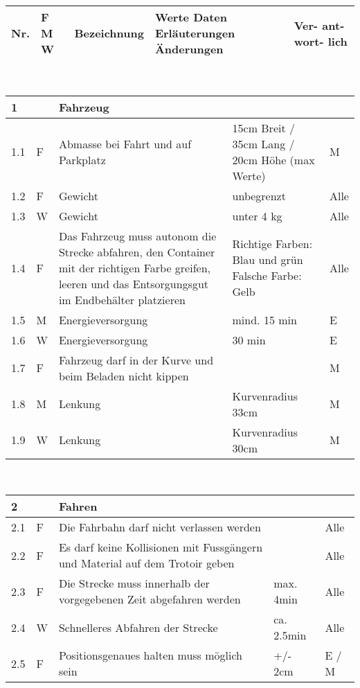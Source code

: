 \begin{center}
\begin{tabular}{|p{1cm}|p{0.5cm}|p{5cm}|p{5cm}|p{1.5cm}|}\hline
\textbf{Nr.} & \textbf{F M W} & \textbf{Bezeichnung} & \textbf{Werte Daten Erläuterungen Änderungen} & \textbf{Ver- ant- wort- lich}\\\hline
\end{tabular}\\[0.3cm]
\begin{tabular}{|p{1cm}|p{0.5cm}|p{5cm}|p{5cm}|p{1.5cm}|}\hline
 \textbf{1} & & \textbf{Fahrzeug} & & \\\hline
 1.1 & F & Abmasse bei Fahrt und auf Parkplatz & 15cm Breit / 35cm Lang / 20cm Höhe (max Werte) & M\\ \hline
 1.2 & F & Gewicht & unbegrenzt & Alle\\\hline
 1.3 & W & Gewicht & unter 4 kg & Alle\\\hline
 1.4 & F & Das Fahrzeug muss autonom die Strecke abfahren, den Container mit der richtigen Farbe greifen, leeren und das Entsorgungsgut im Endbehälter platzieren   & Richtige Farben: Blau und grün Falsche Farbe: Gelb & Alle\\\hline
 1.5 & M & Energieversorgung & mind. 15 min & E \\\hline
 1.6 & W & Energieversorgung & 30 min & E \\\hline
 1.7 & F & Fahrzeug darf in der Kurve und beim Beladen nicht kippen & & M \\\hline
 1.8 & M & Lenkung & Kurvenradius 33cm & M \\\hline
 1.9 & W & Lenkung & Kurvenradius 30cm & M \\\hline
\end{tabular}\\[0.3cm]
\begin{tabular}{|p{1cm}|p{0.5cm}|p{5cm}|p{5cm}|p{1.5cm}|}\hline
 \textbf{2} & & \textbf{Fahren} & & \\\hline
 2.1 & F & Die Fahrbahn darf nicht verlassen werden & & Alle\\\hline
 2.2 & F & Es darf keine Kollisionen mit Fussgängern und Material auf dem Trotoir geben & & Alle \\\hline
 2.3 & F & Die Strecke muss innerhalb der vorgegebenen Zeit abgefahren werden & max. 4min & Alle\\\hline
 2.4 & W & Schnelleres Abfahren der Strecke & ca. 2.5min & Alle\\\hline
 2.5 & F & Positionsgenaues halten muss möglich sein & +/- 2cm & E / M\\\hline

\end{tabular}
\end{center}
